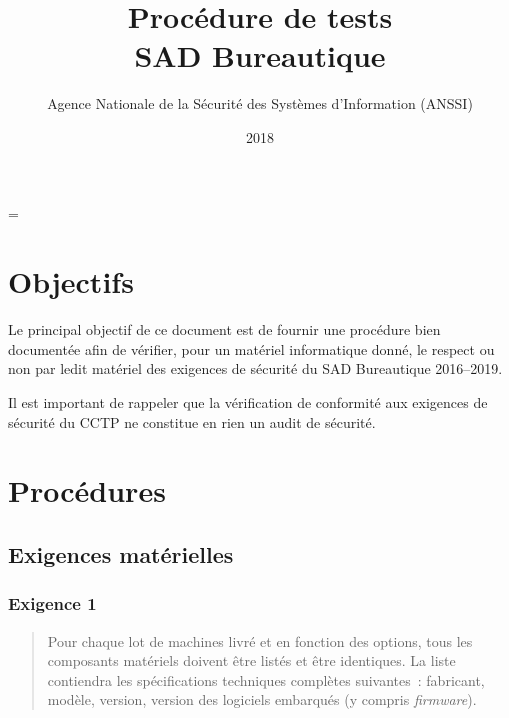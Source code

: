 \documentclass{report}
\title{Procédure de tests \\ SAD Bureautique}
\author{Agence Nationale de la Sécurité des Systèmes d’Information (ANSSI)}
\date{2018}
\begin{document}
\maketitle

\newdimen\longline
\longline=\textwidth\advance\longline-4cm

\def\LayoutTextField#1#2{#2} %

\def\lbl#1{\hbox to 4cm{#1\dotfill\strut}}%
\def\labelline#1#2{\lbl{#1}\vbox{\hbox{\TextField[name=#1,width=#2]{\null}}\kern2pt\hrule}}

\def\q#1{\hbox to \hsize{\labelline{#1}{\longline}}\vskip1.4ex}

\tableofcontents

\part{Objectifs}

Le principal objectif de ce document est de fournir une procédure bien
documentée afin de vérifier, pour un matériel informatique donné, le respect ou
non par ledit matériel des exigences de sécurité du SAD Bureautique 2016--2019.

Il est important de rappeler que la vérification de conformité aux exigences de
sécurité du CCTP ne constitue en rien un audit de sécurité.

\part{Procédures}

\chapter{Exigences matérielles}

\section{Exigence 1}

\begin{quote}
  Pour chaque lot de machines livré et en fonction des options, tous les
  composants matériels doivent être listés et être identiques.
  La liste contiendra les spécifications techniques complètes suivantes~:
  fabricant, modèle, version, version des logiciels embarqués (y compris
  \emph{firmware}).
\end{quote}
\end{document}
